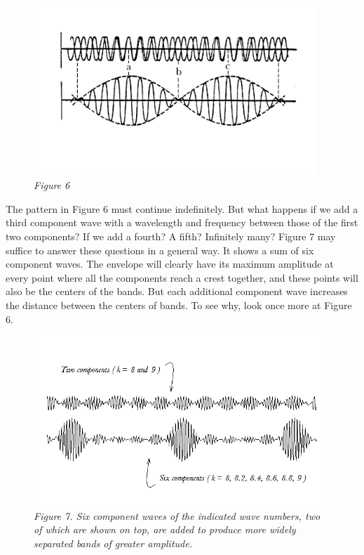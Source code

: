 \begin{figure}[h] %
  \begin{center}
    \includegraphics[width=4.18333in,height=2.51667in]{images/08_debroglie/image039.png}
    \vspace{-3em}
    \caption*{\emph{Figure 6}}
  \end{center}
\end{figure}

The pattern in Figure 6 must continue indefinitely. But what happens if
we add a third component wave with a wavelength and frequency between
those of the first two components? If we add a fourth? A fifth?
Infinitely many? Figure 7 may suffice to answer these questions in a
general way. It shows a sum of six component waves. The envelope will
clearly have its maximum amplitude at every point where all the
components reach a crest together, and these points will also be the
centers of the bands. But each additional component wave increases the
distance between the centers of bands. To see why, look once more at
Figure 6.

\begin{figure}[h] %
  \begin{center}
    \includegraphics[width=4.35334in,height=2.52in]{images/08_debroglie/image041.png}
    \caption*{\emph{Figure 7. Six component waves of the indicated wave numbers, two of
     which are shown on top, are added to produce more widely separated bands
     of greater amplitude.}}
  \end{center}
\end{figure}

